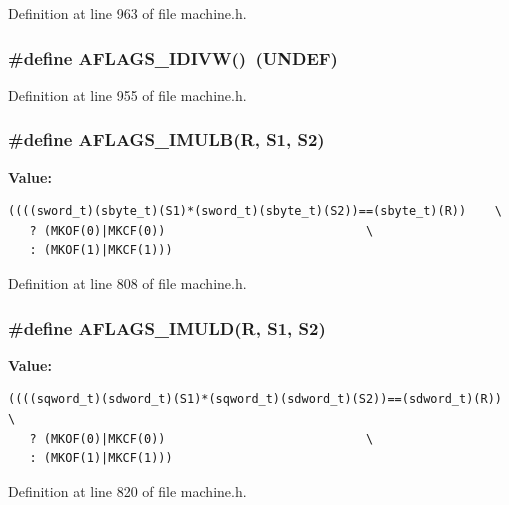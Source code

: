 Definition at line 963 of file machine.h.
\subsubsection[{AFLAGS\_\-IDIVW}]{\setlength{\rightskip}{0pt plus 5cm}\#define AFLAGS\_\-IDIVW()~(UNDEF)}\label{machine_8h_f19bd898849da5dad26d2ee39eedaae5}




Definition at line 955 of file machine.h.
\subsubsection[{AFLAGS\_\-IMULB}]{\setlength{\rightskip}{0pt plus 5cm}\#define AFLAGS\_\-IMULB(R, \/  S1, \/  S2)}\label{machine_8h_351c88a1f3cc617422207654bb739572}


\textbf{Value:}

\begin{Code}\begin{verbatim}((((sword_t)(sbyte_t)(S1)*(sword_t)(sbyte_t)(S2))==(sbyte_t)(R))    \
   ? (MKOF(0)|MKCF(0))                            \
   : (MKOF(1)|MKCF(1)))
\end{verbatim}
\end{Code}


Definition at line 808 of file machine.h.
\subsubsection[{AFLAGS\_\-IMULD}]{\setlength{\rightskip}{0pt plus 5cm}\#define AFLAGS\_\-IMULD(R, \/  S1, \/  S2)}\label{machine_8h_ca5bdfb239eeca2b1575ac2f0fa084df}


\textbf{Value:}

\begin{Code}\begin{verbatim}((((sqword_t)(sdword_t)(S1)*(sqword_t)(sdword_t)(S2))==(sdword_t)(R))    \
   ? (MKOF(0)|MKCF(0))                            \
   : (MKOF(1)|MKCF(1)))
\end{verbatim}
\end{Code}


Definition at line 820 of file machine.h.
